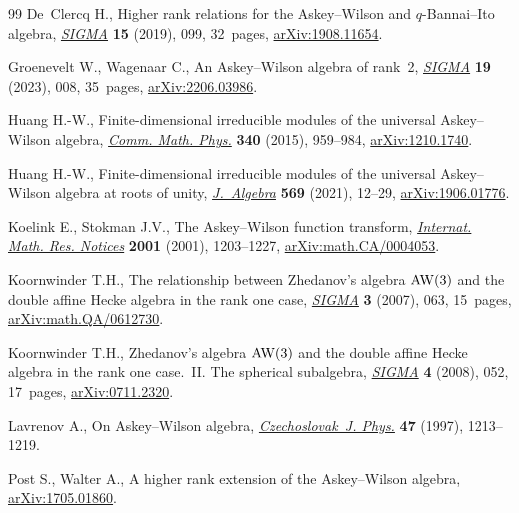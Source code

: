 \documentclass[pdftex]{sigma}
\numberwithin{equation}{section}
\begin{document}
\begin{thebibliography}{99}
De~Clercq H., Higher rank relations for the {A}skey--{W}ilson and
 {$q$}-{B}annai--{I}to algebra, \href{https://doi.org/10.3842/SIGMA.2019.099}{\textit{SIGMA}} \textbf{15} (2019), 099,
 32~pages, \href{https://arxiv.org/abs/1908.11654}{arXiv:1908.11654}.

Groenevelt W., Wagenaar C., An {A}skey--{W}ilson algebra of rank~2,
 \href{https://doi.org/10.3842/SIGMA.2023.008}{\textit{SIGMA}} \textbf{19} (2023), 008, 35~pages, \href{https://arxiv.org/abs/2206.03986}{arXiv:2206.03986}.

Huang H.-W., Finite-dimensional irreducible modules of the universal
 {A}skey--{W}ilson algebra, \href{https://doi.org/10.1007/s00220-015-2467-9}{\textit{Comm. Math. Phys.}} \textbf{340} (2015),
 959--984, \href{https://arxiv.org/abs/1210.1740}{arXiv:1210.1740}.

Huang H.-W., Finite-dimensional irreducible modules of the universal
 {A}skey--{W}ilson algebra at roots of unity, \href{https://doi.org/10.1016/j.jalgebra.2020.11.012}{\textit{J.~Algebra}} \textbf{569}
 (2021), 12--29, \href{https://arxiv.org/abs/1906.01776}{arXiv:1906.01776}.

Koelink E., Stokman J.V., The {A}skey--{W}ilson function transform,
 \href{https://doi.org/10.1155/S1073792801000575}{\textit{Internat. Math. Res. Notices}} \textbf{2001} (2001), 1203--1227,
 \href{https://arxiv.org/abs/math.CA/0004053}{arXiv:math.CA/0004053}.

Koornwinder T.H., The relationship between {Z}hedanov's algebra {${\rm AW}(3)$}
 and the double affine {H}ecke algebra in the rank one case, \href{https://doi.org/10.3842/SIGMA.2007.063}{\textit{SIGMA}}
 \textbf{3} (2007), 063, 15~pages, \href{https://arxiv.org/abs/math.QA/0612730}{arXiv:math.QA/0612730}.

Koornwinder T.H., Zhedanov's algebra {$\rm AW(3)$} and the double affine
 {H}ecke algebra in the rank one case.~{II}. {T}he spherical subalgebra,
 \href{https://doi.org/10.3842/SIGMA.2008.052}{\textit{SIGMA}} \textbf{4} (2008), 052, 17~pages, \href{https://arxiv.org/abs/0711.2320}{arXiv:0711.2320}.

Lavrenov A., On {A}skey--{W}ilson algebra, \href{https://doi.org/10.1023/A:1022821531517}{\textit{Czechoslovak~J. Phys.}}
 \textbf{47} (1997), 1213--1219.

Post S., Walter A., A higher rank extension of the {A}skey--{W}ilson algebra,
 \href{https://arxiv.org/abs/1705.01860}{arXiv:1705.01860}.


\end{thebibliography}
\end{document}
